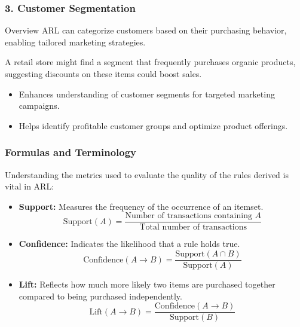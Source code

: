 \documentclass{beamer}
\begin{document}
\begin{frame}[fragile]
    \frametitle{3. Customer Segmentation}
    \begin{block}{Overview}
        ARL can categorize customers based on their purchasing behavior, enabling tailored marketing strategies.
    \end{block}
    
    \begin{example}
        A retail store might find a segment that frequently purchases organic products, suggesting discounts on these items could boost sales.
    \end{example}

    \begin{itemize}
        \item Enhances understanding of customer segments for targeted marketing campaigns.
        \item Helps identify profitable customer groups and optimize product offerings.
    \end{itemize}
\end{frame}

\begin{frame}[fragile]
    \frametitle{Formulas and Terminology}
    Understanding the metrics used to evaluate the quality of the rules derived is vital in ARL:
    
    \begin{itemize}
        \item \textbf{Support:} Measures the frequency of the occurrence of an itemset.
            \begin{equation}
            \text{Support}(A) = \frac{\text{Number of transactions containing } A}{\text{Total number of transactions}}
            \end{equation}
        
        \item \textbf{Confidence:} Indicates the likelihood that a rule holds true.
            \begin{equation}
            \text{Confidence}(A \rightarrow B) = \frac{\text{Support}(A \cap B)}{\text{Support}(A)}
            \end{equation}
        
        \item \textbf{Lift:} Reflects how much more likely two items are purchased together compared to being purchased independently.
            \begin{equation}
            \text{Lift}(A \rightarrow B) = \frac{\text{Confidence}(A \rightarrow B)}{\text{Support}(B)}
            \end{equation}
    \end{itemize}
\end{frame}
\end{document}
